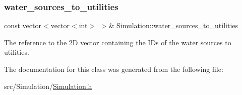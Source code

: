 \subsubsection{\texorpdfstring{water\+\_\+sources\+\_\+to\+\_\+utilities}{water\_sources\_to\_utilities}}
{\footnotesize\ttfamily const vector$<$vector$<$int$>$ $>$\& Simulation\+::water\+\_\+sources\+\_\+to\+\_\+utilities\hspace{0.3cm}{\ttfamily [private]}}



The reference to the 2D vector containing the I\+Ds of the water sources to utilities. 



The documentation for this class was generated from the following file\+:\begin{DoxyCompactItemize}
\item 
src/\+Simulation/\mbox{\hyperlink{Simulation_8h}{Simulation.\+h}}\end{DoxyCompactItemize}
